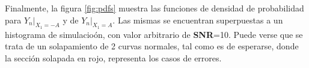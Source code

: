 Finalmente, la figura \ref{fig:pdfs} muestra las funciones de densidad de probabilidad para $Y_n|_{X_1=-A}$ y de $Y_n|_{X_1=A}$. Las mismas se encuentran superpuestas a un histograma de simulacioón, con valor arbitrario de \textbf{SNR}=10. Puede verse que se trata de un solapamiento de 2 curvas normales, tal como es de esperarse, donde la sección solapada en rojo, representa los casos de errores.